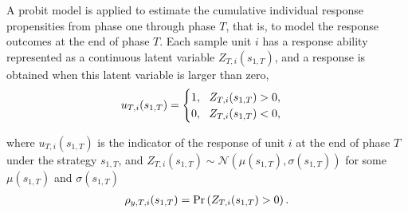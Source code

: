 \documentclass[12pt]{article}
\begin{document}





A probit model is applied to estimate the cumulative individual response propensities from phase one through phase $T$, that is, to model the response outcomes at the end of phase $T$.
Each sample unit $i$ has a response ability represented as a continuous latent variable $Z_{T,i}(s_{1,T})$, and a response is obtained when this latent variable is larger than zero,
\let\saveeqnno\theequation
\let\savefrac\frac
\def\dispfrac{\displaystyle\savefrac}
\begin{eqnarray*}
\let\frac\dispfrac
\let\theHequation\theequation
	u_{T,i}(s_{1,T})=
    \begin{cases}
    1, ~~Z_{T,i}(s_{1,T})>0, \\
    0, ~~Z_{T,i}(s_{1,T})<0,
    \end{cases}
\end{eqnarray*}
\global\let\theequation\saveeqnno
\addtocounter{equation}{-1}\ignorespaces

where $u_{T,i}(s_{1,T})$ is the indicator of the response of unit $i$ at the end of phase $T$ under the strategy $s_{1,T}$, and $Z_{T,i}(s_{1,T}) \sim \mathcal{N}\left(\mu(s_{1,T}),\sigma(s_{1,T})\right)$ for some $\mu(s_{1,T})$ and $\sigma(s_{1,T})$
\let\saveeqnno\theequation
\let\savefrac\frac
\def\dispfrac{\displaystyle\savefrac}
\begin{eqnarray*}
\let\frac\dispfrac
\let\theHequation\theequation
	\rho_{y,T,i}(s_{1,T})=\Pr\left(Z_{T,i}(s_{1,T})>0\right).
\end{eqnarray*}
\global\let\theequation\saveeqnno
\addtocounter{equation}{-1}\ignorespaces
\end{document}
